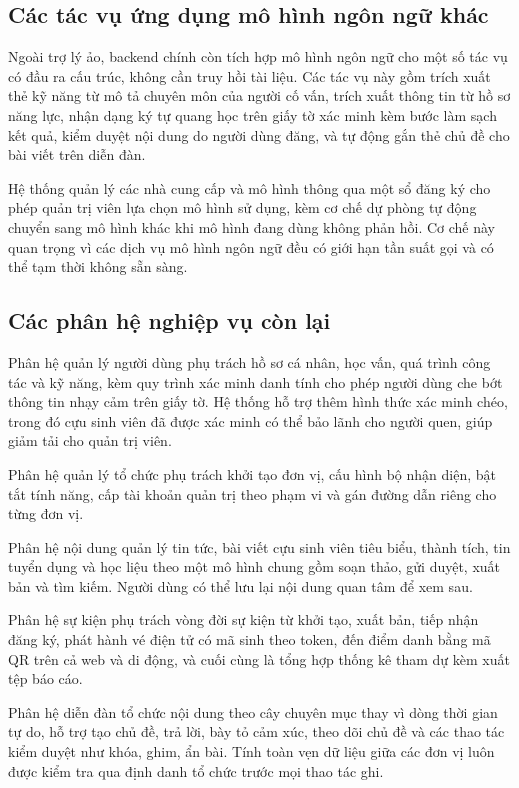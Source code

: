 \documentclass[12pt,a4paper,oneside]{report}
\begin{document}
\subsection{Các tác vụ ứng dụng mô hình ngôn ngữ khác}

Ngoài trợ lý ảo, backend chính còn tích hợp mô hình ngôn ngữ cho một số tác vụ có đầu ra cấu trúc, không cần truy hồi tài liệu. Các tác vụ này gồm trích xuất thẻ kỹ năng từ mô tả chuyên môn của người cố vấn, trích xuất thông tin từ hồ sơ năng lực, nhận dạng ký tự quang học trên giấy tờ xác minh kèm bước làm sạch kết quả, kiểm duyệt nội dung do người dùng đăng, và tự động gắn thẻ chủ đề cho bài viết trên diễn đàn.

Hệ thống quản lý các nhà cung cấp và mô hình thông qua một sổ đăng ký cho phép quản trị viên lựa chọn mô hình sử dụng, kèm cơ chế dự phòng tự động chuyển sang mô hình khác khi mô hình đang dùng không phản hồi. Cơ chế này quan trọng vì các dịch vụ mô hình ngôn ngữ đều có giới hạn tần suất gọi và có thể tạm thời không sẵn sàng.

\subsection{Các phân hệ nghiệp vụ còn lại}

Phân hệ quản lý người dùng phụ trách hồ sơ cá nhân, học vấn, quá trình công tác và kỹ năng, kèm quy trình xác minh danh tính cho phép người dùng che bớt thông tin nhạy cảm trên giấy tờ. Hệ thống hỗ trợ thêm hình thức xác minh chéo, trong đó cựu sinh viên đã được xác minh có thể bảo lãnh cho người quen, giúp giảm tải cho quản trị viên.

Phân hệ quản lý tổ chức phụ trách khởi tạo đơn vị, cấu hình bộ nhận diện, bật tắt tính năng, cấp tài khoản quản trị theo phạm vi và gán đường dẫn riêng cho từng đơn vị.

Phân hệ nội dung quản lý tin tức, bài viết cựu sinh viên tiêu biểu, thành tích, tin tuyển dụng và học liệu theo một mô hình chung gồm soạn thảo, gửi duyệt, xuất bản và tìm kiếm. Người dùng có thể lưu lại nội dung quan tâm để xem sau.

Phân hệ sự kiện phụ trách vòng đời sự kiện từ khởi tạo, xuất bản, tiếp nhận đăng ký, phát hành vé điện tử có mã sinh theo token, đến điểm danh bằng mã QR trên cả web và di động, và cuối cùng là tổng hợp thống kê tham dự kèm xuất tệp báo cáo.

Phân hệ diễn đàn tổ chức nội dung theo cây chuyên mục thay vì dòng thời gian tự do, hỗ trợ tạo chủ đề, trả lời, bày tỏ cảm xúc, theo dõi chủ đề và các thao tác kiểm duyệt như khóa, ghim, ẩn bài. Tính toàn vẹn dữ liệu giữa các đơn vị luôn được kiểm tra qua định danh tổ chức trước mọi thao tác ghi.
\end{document}
